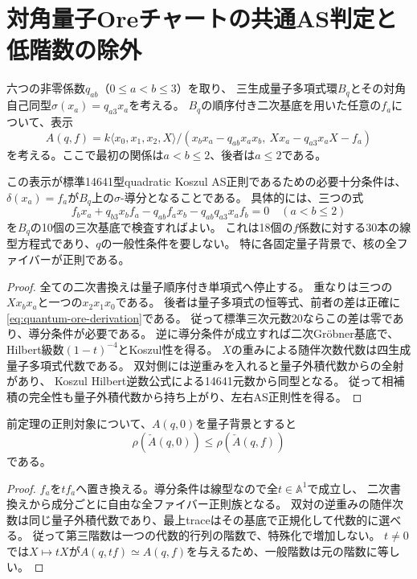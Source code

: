 \section{対角量子Oreチャートの共通AS判定と低階数の除外}
\label{sec:quantum-ore}
六つの非零係数$q_{ab}$（$0\leq a<b\leq3$）を取り、
三生成量子多項式環$B_q$とその対角自己同型$\sigma(x_a)=q_{a3}x_a$を考える。
$B_q$の順序付き二次基底を用いた任意の$f_a$について、表示
\[
 A(q,f)=k\langle x_0,x_1,x_2,X\rangle/
 (x_bx_a-q_{ab}x_ax_b,\ Xx_a-q_{a3}x_aX-f_a)
\]
を考える。ここで最初の関係は$a<b\leq2$、後者は$a\leq2$である。

\begin{theorem}[全対角量子背景での有限AS判定]\label{thm:quantum-ore-as}
この表示が標準14641型quadratic Koszul AS正則であるための必要十分条件は、
$\delta(x_a)=f_a$が$B_q$上の$\sigma$-導分となることである。
具体的には、三つの式
\begin{equation}\label{eq:quantum-ore-derivation}
 f_bx_a+q_{b3}x_bf_a-q_{ab}f_ax_b-q_{ab}q_{a3}x_af_b=0\quad(a<b\leq2)
\end{equation}
を$B_q$の10個の三次基底で検査すればよい。
これは18個の$f$係数に対する30本の線型方程式であり、$q$の一般性条件を要しない。
特に各固定量子背景で、核の全ファイバーが正則である。
\end{theorem}
\begin{proof}
全ての二次書換えは量子順序付き単項式へ停止する。
重なりは三つの$Xx_bx_a$と一つの$x_2x_1x_0$である。
後者は量子多項式の恒等式、前者の差は正確に\eqref{eq:quantum-ore-derivation}である。
従って標準三次元数20ならこの差は零であり、導分条件が必要である。
逆に導分条件が成立すれば二次Gr\"obner基底で、Hilbert級数$(1-t)^{-4}$とKoszul性を得る。
$X$の重みによる随伴次数代数は四生成量子多項式代数である。
双対側には逆重みを入れると量子外積代数からの全射があり、
Koszul Hilbert逆数公式による14641元数から同型となる。
従って相補積の完全性も量子外積代数から持ち上がり、左右AS正則性を得る。
\end{proof}

\begin{lemma}[量子背景への特殊化と階数下界]\label{lem:quantum-ore-background-rank}
前定理の正則対象について、$A(q,0)$を量子背景とすると
\[
 \rho(\check A(q,0))\leq\rho(\check A(q,f))
\]
である。
\end{lemma}
\begin{proof}
$f_a$を$t f_a$へ置き換える。導分条件は線型なので全$t\in\mathbb A^1$で成立し、
二次書換えから成分ごとに自由な全ファイバー正則族となる。
双対の逆重みの随伴次数は同じ量子外積代数であり、最上traceはその基底で正規化して代数的に選べる。
従って第三階数は一つの代数的行列の階数で、特殊化で増加しない。
$t\ne0$では$X\mapsto tX$が$A(q,t f)\simeq A(q,f)$を与えるため、一般階数は元の階数に等しい。
\end{proof}

